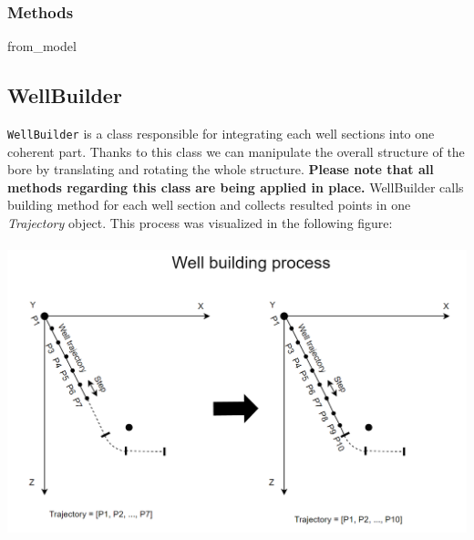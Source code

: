 \subsubsection{Methods}
\begin{description}
	\item[\colorbox{gray!20}{from\_model}] \hfill
\end{description}

\subsection{WellBuilder}
	\texttt{WellBuilder} is a class responsible for integrating each well sections into one coherent part. Thanks to this class we can manipulate the overall structure of the bore by translating and rotating the whole structure. \textbf{Please note that all methods regarding this class are being applied in place.}
	WellBuilder calls building method for each well section and collects resulted points in one \textit{Trajectory} object. This process was visualized in the following figure:\\\\
	\includegraphics[width=\textwidth]{"images/well_builder/well_building_process.png"}\\


